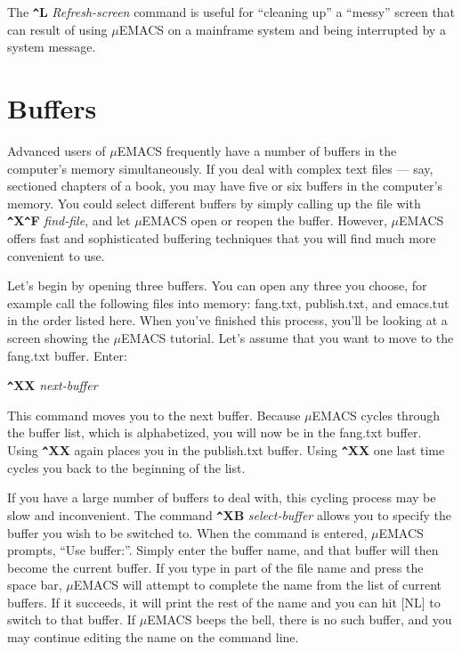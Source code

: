 The {\bf \verb+^+L} {\it Refresh-screen} command is useful for
``cleaning up'' a ``messy'' screen that can result of using $\mu$EMACS
on a mainframe system and being interrupted by a system message.

\chapter{Buffers}

Advanced users of $\mu$EMACS frequently have a number of buffers in the
computer's memory simultaneously. If you deal with complex text files
--- say, sectioned chapters of a book, you may have five or six buffers
in the computer's memory. You could select different buffers by simply
calling up the file with {\bf \verb+^+X\verb+^+F} {\it find-file}, and
let $\mu$EMACS open or reopen the buffer. However, $\mu$EMACS offers
fast and sophisticated buffering techniques that you will find much
more convenient to use.

Let's begin by opening three buffers. You can open any three you
choose, for example call the following files into memory: fang.txt,
publish.txt, and emacs.tut in the order listed here. When you've
finished this process, you'll be looking at a screen showing the $\mu$EMACS
tutorial. Let's assume that you want to move to the fang.txt buffer.
Enter:

{\bf \verb+^+XX} {\it next-buffer}

This command moves you to the next buffer. Because $\mu$EMACS cycles
through the buffer list, which is alphabetized, you will now be in the
fang.txt buffer. Using {\bf \verb+^+XX} again places you in the
publish.txt buffer. Using {\bf \verb+^+XX} one last time cycles you
back to the beginning of the list.

If you have a large number of buffers to deal with, this cycling
process may be slow and inconvenient. The command {\bf \verb+^+XB} {\it
select-buffer} allows you to specify the buffer you wish to be switched
to. When the command is entered, $\mu$EMACS prompts, ``Use buffer:''.
Simply enter the buffer name, and that buffer will then become the
current buffer. If you type in part of the file name and press the
space bar, $\mu$EMACS will attempt to complete the name from the list
of current buffers. If it succeeds, it will print the rest of the name
and you can hit [NL] to switch to that buffer. If $\mu$EMACS beeps the
bell, there is no such buffer, and you may continue editing the name on
the command line.

